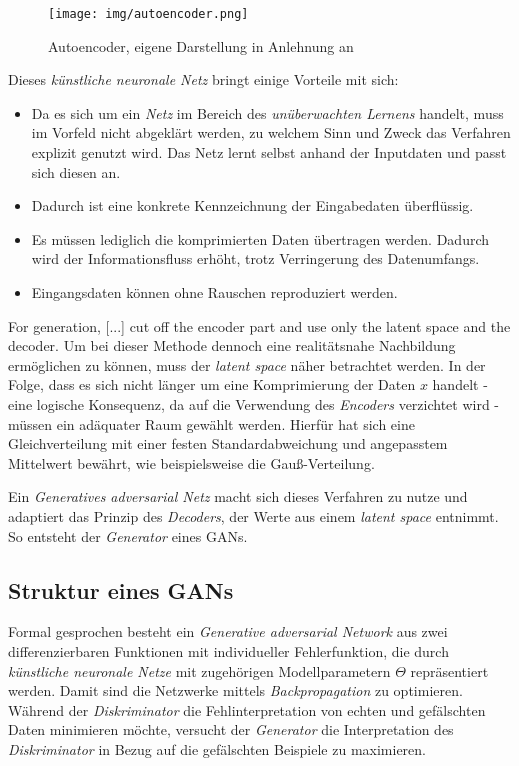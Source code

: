 \begin{figure}[H]
	\centering
	\texttt{[image: img/autoencoder.png]}
	\caption{Autoencoder, eigene Darstellung in Anlehnung an \cite[S. 20]{5}}
	\label{fig:autoencoder}
\end{figure}

Dieses \textit{künstliche neuronale Netz} bringt einige Vorteile mit sich:

\begin{itemize}
	\item Da es sich um ein \textit{Netz} im Bereich des \textit{unüberwachten Lernens} handelt, muss im Vorfeld nicht abgeklärt werden, zu welchem Sinn und Zweck das Verfahren explizit genutzt wird. Das Netz lernt selbst anhand der Inputdaten und passt sich diesen an.
	\item Dadurch ist eine konkrete Kennzeichnung der Eingabedaten überflüssig.
	\item Es müssen lediglich die komprimierten Daten übertragen werden. Dadurch wird der Informationsfluss erhöht, trotz Verringerung des Datenumfangs.
	\item Eingangsdaten können ohne Rauschen reproduziert werden.
\end{itemize}

\glqq For generation, [...] cut off the encoder part and use only the latent space and the decoder.\grqq{} \cite[S. 24]{5}
Um bei dieser Methode dennoch eine realitätsnahe Nachbildung ermöglichen zu können, muss der \textit{latent space} näher betrachtet werden. In der Folge, dass es sich nicht länger um eine Komprimierung der Daten $x$ handelt - eine logische Konsequenz, da auf die Verwendung des \textit{Encoders} verzichtet wird - müssen ein adäquater Raum gewählt werden. Hierfür hat sich eine Gleichverteilung mit einer festen Standardabweichung und angepasstem Mittelwert bewährt, wie beispielsweise die Gauß-Verteilung.

Ein \textit{Generatives adversarial Netz} macht sich dieses Verfahren zu nutze und adaptiert das Prinzip des \textit{Decoders}, der Werte aus einem \textit{latent space} entnimmt. So entsteht der \textit{Generator} eines GANs. 
\cites[vgl.][]{31,32}[S. 18-25]{5}

\subsection{Struktur eines GANs}

Formal gesprochen besteht ein \textit{Generative adversarial Network} aus zwei differenzierbaren Funktionen mit individueller Fehlerfunktion, die durch \textit{künstliche neuronale Netze} mit zugehörigen Modellparametern $\Theta$ repräsentiert werden. Damit sind die Netzwerke mittels \textit{Backpropagation} zu optimieren. \\
Während der \textit{Diskriminator} die Fehlinterpretation von echten und gefälschten Daten minimieren möchte, versucht der \textit{Generator} die Interpretation des \textit{Diskriminator} in Bezug auf die gefälschten Beispiele zu maximieren. 
\cite[vgl.][S. 37]{5} \cite[vgl.][S. 2]{4}

